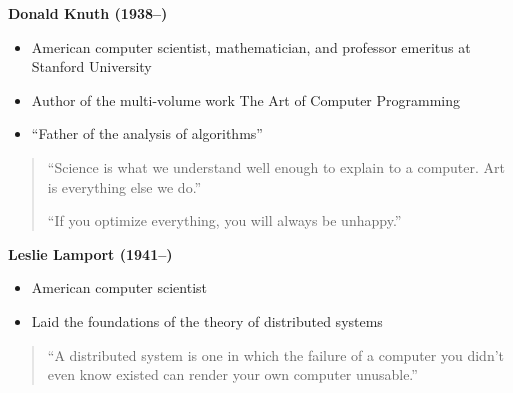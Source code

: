 {
\begin{frame}[plain,t]
\vfill
\hfill
\begin{minipage}{.42\textwidth}
\hspace{1em}\textbf{\large Donald Knuth (1938--)}
\begin{itemize}
\item American computer scientist, mathematician, and professor emeritus at Stanford University
\item Author of the multi-volume work The Art of Computer Programming
\item ``Father of the analysis of algorithms''
\end{itemize}
\end{minipage}

\bigskip

\begin{quote}
``Science is what we understand well enough to explain to a computer. Art is everything else we do.''

\medskip

``If you optimize everything, you will always be unhappy.''
\end{quote}
\vspace*{-4\baselineskip}\null
\end{frame}}


{
\begin{frame}[plain,t]
\vfill
\begin{minipage}{.45\textwidth}
\hspace{1em}\textbf{\large Leslie Lamport (1941--)}
\begin{itemize}
\item American computer scientist
\item Laid the foundations of the theory of distributed systems
\end{itemize}

\bigskip

\begin{quote}
``A distributed system is one in which the failure of a computer you didn't even know existed can render your own computer unusable.''\end{quote}
\end{minipage}
\end{frame}
}

